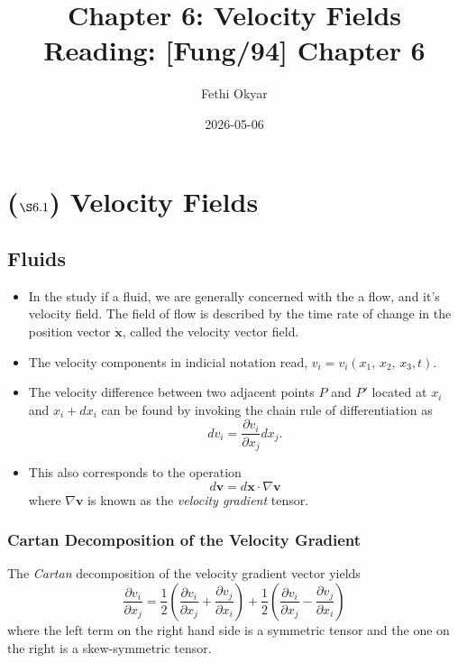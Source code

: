\documentclass[11pt]{article}
\author{Fethi Okyar}
\date{2026-05-06}
\title{Chapter 6: Velocity Fields\\\medskip
\large Reading: [Fung/94] Chapter 6}
\begin{document}
\maketitle
\setcounter{tocdepth}{1}
\tableofcontents

\section*{(\(\S6.1\)) Velocity Fields}
\label{sec:orgb2d6bdf}
\subsection*{Fluids}
\label{sec:orgc4b3d34}
\begin{itemize}
\item In the study if a fluid, we are generally concerned with the a flow, and it's velocity field. The field of flow is described by the time rate of change in the position vector \(\dot{\boldsymbol{x}}\), called the velocity vector field.
\end{itemize}
\begin{itemize}
\item The velocity components in indicial notation read, \(v_i = v_i(x_1,\,x_2,\,x_3,t)\).
\item The velocity difference between two adjacent points \(P\) and \(P'\) located at \(x_i\) and \(x_i + dx_i\) can be found by invoking the chain rule of differentiation as
$$ dv_i = \frac{\partial v_i}{\partial x_j} dx_j. $$
\item This also corresponds to the operation
$$ d\boldsymbol{v} = d\boldsymbol{x} \cdot \nabla\boldsymbol{v} $$
where \(\nabla\boldsymbol{v}\) is known as the \emph{velocity gradient} tensor.
\end{itemize}
\subsubsection*{Cartan Decomposition of the Velocity Gradient}
\label{sec:org8b648af}
The \emph{Cartan} decomposition of the velocity gradient vector yields
  $$ \frac{\partial v_i}{\partial x_j} = \frac{1}{2} \left( \frac{\partial v_i}{\partial x_j} + \frac{\partial v_j}{\partial x_i} \right) +  \frac{1}{2} \left( \frac{\partial v_i}{\partial x_j} - \frac{\partial v_j}{\partial x_i} \right) $$
  where the left term on the right hand side is a symmetric tensor and the one on the right is a skew-symmetric tensor.
\end{document}
